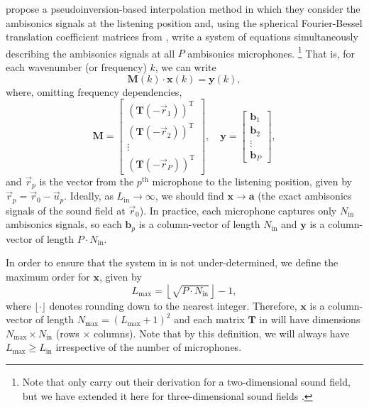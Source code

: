 \citet[section III.A]{Samarasinghe2014a} propose a pseudoinversion-based interpolation method in which they consider the ambisonics signals at the listening position and, using the spherical Fourier-Bessel translation coefficient matrices from , write a system of equations simultaneously describing the ambisonics signals at all $P$ ambisonics microphones.%
\footnote{Note that \citeauthor{Samarasinghe2014a} only carry out their derivation for a two-dimensional sound field, but we have extended it here for three-dimensional sound fields \citep[section 3.2]{TylkaChoueiri2016}.}
That is, for each wavenumber (or frequency) $k$, we can write
\begin{equation}\label{eq:03_Navigation_Techniques:Linear_System}
\mathbf{M}(k) \cdot \mathbf{x}(k) = \mathbf{y}(k),
\end{equation}
where, omitting frequency dependencies,
\begin{equation}\label{eq:03_Navigation_Techniques:Linear_System_Matrices}
\mathbf{M} = 
    \left[ \begin{array}{c}
    \left( \mathbf{T}(-\vec{r}_1) \right)^\text{T} \\
    \left( \mathbf{T}(-\vec{r}_2) \right)^\text{T} \\
    \vdots\\
    \left( \mathbf{T}(-\vec{r}_P) \right)^\text{T}
    \end{array} \right]
,\quad
\mathbf{y} = 
    \left[ \begin{array}{c}
    \mathbf{b}_1\\
    \mathbf{b}_2\\
    \vdots\\
    \mathbf{b}_P
    \end{array} \right],
\end{equation}
and $\vec{r}_p$ is the vector from the $p^\textrm{th}$ microphone to the listening position, given by $\vec{r}_p = \vec{r}_0 - \vec{u}_p$.
Ideally, as $L_\textrm{in} \to \infty$, we should find $\mathbf{x} \to \mathbf{a}$ (the exact ambisonics signals of the sound field at $\vec{r}_0$).
In practice, each microphone captures only $N_\textrm{in}$ ambisonics signals, so each $\mathbf{b}_p$ is a column-vector of length $N_\textrm{in}$ and $\mathbf{y}$ is a column-vector of length $P \cdot N_\textrm{in}$.

In order to ensure that the system in  is not under-determined, we define the maximum order for $\mathbf{x}$, given by
\begin{equation}\label{eq:03_Navigation_Techniques:Pinv_Interpolation_Lmax}
L_\textrm{max} = \left\lfloor \sqrt{P \cdot N_\textrm{in}} \right\rfloor - 1,
\end{equation}
where $\lfloor \cdot \rfloor$ denotes rounding down to the nearest integer.
Therefore, $\mathbf{x}$ is a column-vector of length $N_\textrm{max} = (L_\textrm{max} + 1)^2$ and each matrix $\mathbf{T}$ in  will have dimensions $N_\textrm{max} \times N_\textrm{in}$ (rows $\times$ columns).
Note that by this definition, we will always have $L_\textrm{max} \geq L_\textrm{in}$ irrespective of the number of microphones.

